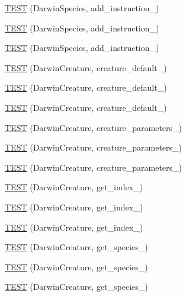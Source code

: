 \begin{DoxyCompactItemize}
\item 
\hyperlink{TestDarwin_8c_09_09_adccec3ac108bee175a1f4f1c3e05dec4}{T\-E\-S\-T} (Darwin\-Species, add\-\_\-instruction\-\_)
\item 
\hyperlink{TestDarwin_8c_09_09_a4f9d298ccb235dd53fe6ca5ce60f6bc5}{T\-E\-S\-T} (Darwin\-Species, add\-\_\-instruction\-\_)
\item 
\hyperlink{TestDarwin_8c_09_09_a4361e39a69f5caba9e8ff70c623694f6}{T\-E\-S\-T} (Darwin\-Species, add\-\_\-instruction\-\_)
\item 
\hyperlink{TestDarwin_8c_09_09_ad3f3756c7378b1974cc4b0d27104b42c}{T\-E\-S\-T} (Darwin\-Creature, creature\-\_\-default\-\_)
\item 
\hyperlink{TestDarwin_8c_09_09_a359a237d7742aaa5d54c172bdf2bad51}{T\-E\-S\-T} (Darwin\-Creature, creature\-\_\-default\-\_)
\item 
\hyperlink{TestDarwin_8c_09_09_a47715a680836a03f58aecd75b9343f4b}{T\-E\-S\-T} (Darwin\-Creature, creature\-\_\-default\-\_)
\item 
\hyperlink{TestDarwin_8c_09_09_ae3ce7093462de84257e646f2604e4958}{T\-E\-S\-T} (Darwin\-Creature, creature\-\_\-parameters\-\_)
\item 
\hyperlink{TestDarwin_8c_09_09_a69cfbfe7990a4995e4cae7dbc340b823}{T\-E\-S\-T} (Darwin\-Creature, creature\-\_\-parameters\-\_)
\item 
\hyperlink{TestDarwin_8c_09_09_ab52ae9917871052d08ffa0e696641fd1}{T\-E\-S\-T} (Darwin\-Creature, creature\-\_\-parameters\-\_)
\item 
\hyperlink{TestDarwin_8c_09_09_a8ecec8142f97d5662f67a05d5e11a3e1}{T\-E\-S\-T} (Darwin\-Creature, get\-\_\-index\-\_)
\item 
\hyperlink{TestDarwin_8c_09_09_aaaefa3c3766cfb14402f96c29f70e975}{T\-E\-S\-T} (Darwin\-Creature, get\-\_\-index\-\_)
\item 
\hyperlink{TestDarwin_8c_09_09_a74ba6d20eafa18502b53c83d82e76a42}{T\-E\-S\-T} (Darwin\-Creature, get\-\_\-index\-\_)
\item 
\hyperlink{TestDarwin_8c_09_09_a76e08841e01671e9a67b82b2abfa27d5}{T\-E\-S\-T} (Darwin\-Creature, get\-\_\-species\-\_)
\item 
\hyperlink{TestDarwin_8c_09_09_ac3801a2219480d5f6f1ecb2e8659de30}{T\-E\-S\-T} (Darwin\-Creature, get\-\_\-species\-\_)
\item 
\hyperlink{TestDarwin_8c_09_09_a60c98b00c56514beb935d16e2aea149f}{T\-E\-S\-T} (Darwin\-Creature, get\-\_\-species\-\_)
\item 

\end{DoxyCompactItemize}
